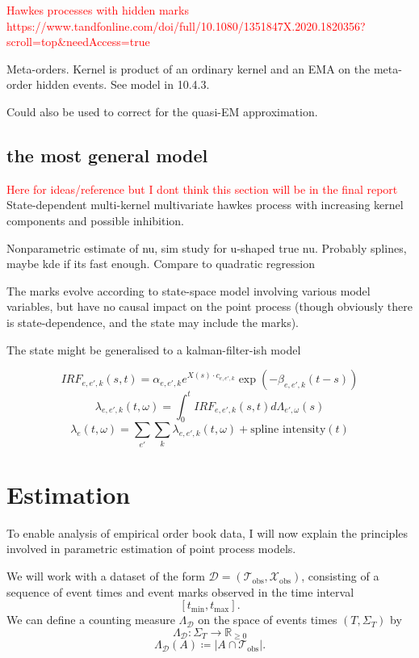 \documentclass[honours,12pt]{unswthesis}
\numberwithin{equation}{section}
\begin{document}
\textcolor{red}{Hawkes processes with hidden marks https://www.tandfonline.com/doi/full/10.1080/1351847X.2020.1820356?scroll=top&needAccess=true}

Meta-orders. Kernel is product of an ordinary kernel and an EMA on the meta-order hidden events. See model in \cite{BouchaudEtAl} 10.4.3.

Could also be used to correct for the quasi-EM approximation.

\section{the most general model}
\textcolor{red}{Here for ideas/reference but I dont think this section will be in the final report}
State-dependent multi-kernel multivariate hawkes process with increasing kernel components and possible inhibition.

Nonparametric estimate of nu, sim study for u-shaped true nu. Probably splines, maybe kde if its fast enough. Compare to quadratic regression

The marks evolve according to state-space model involving various model variables, but have no causal impact on the point process (though obviously there is state-dependence, and the state may include the marks).

The state might be generalised to a kalman-filter-ish model \cite{SmithBrown}

$$IRF_{e,e',k}(s,t) = \alpha_{e,e',k} e^{X(s)\cdot c_{e,e',k}}\exp\left(-\beta_{e,e',k}(t-s)\right)$$
$$\lambda_{e,e',k}(t,\omega) = \int_0^t IRF_{e,e',k}(s,t) d\Lambda_{e',\omega}(s)$$
$$\lambda_e(t,\omega) = \sum_{e'} \sum_k \lambda_{e,e',k}(t,\omega) + \text{spline intensity}(t)$$


\chapter{Estimation}%

To enable analysis of empirical order book data, I will now explain the principles involved in parametric estimation of point process models.

We will work with a dataset of the form $\mathcal{D} = \left(\mathcal{T}_\mathrm{obs},\mathcal{X}_\mathrm{obs}\right)$, consisting of a sequence of event times and event marks observed in the time interval $$[t_\mathrm{min},t_\mathrm{max}].$$
We can define a counting measure $\Lambda_\mathcal{D}$ on the space of events times $(T,\Sigma_T)$ by
$$\Lambda_{\mathcal{D}} : \Sigma_T \to \mathbb{R}_{\geq 0}$$
$$\Lambda_{\mathcal{D}}(A) \coloneq \left\vert A\cap\mathcal{T}_\mathrm{obs}\right\vert.$$
\end{document}
